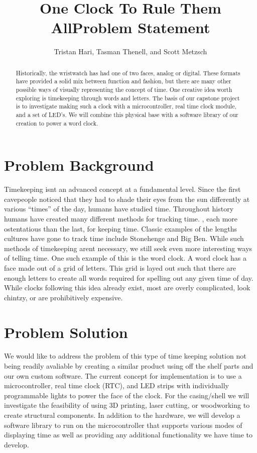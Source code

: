 \documentclass[10pt,draftclsnofoot,onecolumn]{IEEEtran}
\begin{document}
\title{One Clock To Rule Them All}
\author{Tristan Hari, Tasman Thenell, and Scott Metzsch}
\maketitle
\begin{abstract}
Historically, the wristwatch has had one of two faces, analog or digital. These
formats have provided a solid mix between function and fashion, but there are
many other possible ways of visually representing the concept of time. One
creative idea worth exploring is timekeeping through words and letters. The
basis of our capstone project is to investigate making such a clock with a
microcontroller, real time clock module, and a set of LED’s. We will combine
this physical base with a software library of our creation to power a word clock.
\end{abstract}
\IEEEpeerreviewmaketitle

\newpage
{}

\title{Problem Statement}
\section{Problem Background}
Timekeeping isn\textquotesingle t an advanced concept at a fundamental level. Since the first
cavepeople noticed that they had to shade their eyes from the sun differently
at various ``times'' of the day, humans have studied time. Throughout history
humans have created many different methods for tracking time. , each more
ostentatious than the last, for keeping time. Classic examples of the lengths
cultures have gone to track time include Stonehenge and Big Ben. While such
methods of timekeeping aren\textquotesingle t necessary, we still seek even more
interesting ways of telling time. One such example of this is the word clock. A
word clock has a face made out of a grid of letters. This grid is layed out such that
there are enough letters to create all words required for spelling out any given time
of day. While clocks following this idea already exist, most are overly complicated,
look chintzy, or are prohibitively expensive.

\section{Problem Solution}
We would like to address the problem of this type of time keeping solution not
being readily avaliable by creating a similar product using
off the shelf parts and our own custom software. The current concept for
implementation is to use a microcontroller, real time clock (RTC), and LED strips
with individually programmable lights to power the face of the clock. For the
casing/shell we will investigate the feasibility of using 3D printing, laser cutting,
or woodworking to create structural components. In addition to the hardware, we
will develop a software library to run on the microcontroller that supports
various modes of displaying time as well as providing any additional functionality
we have time to develop.
\end{document}
